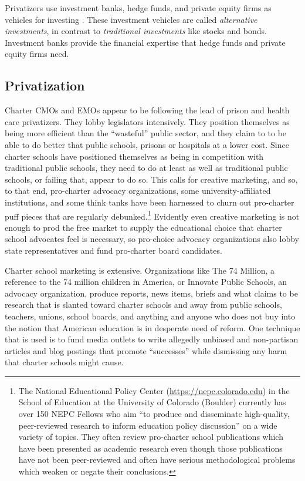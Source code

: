 Privatizers use investment banks, hedge funds, and private equity firms as vehicles for investing \parencite{Stowell2018}. These investment vehicles are called \textit{alternative investments}, in contrast to \textit{traditional investments} like stocks and bonds. Investment banks provide the financial expertise that hedge funds and private equity firms need. 

\subsection{Privatization}\label{sec:privatization}\indent

Charter CMOs and EMOs appear to be following the lead of prison and health care privatizers. They lobby legislators intensively. They position themselves as being more efficient than the ``wasteful'' public sector, and they claim to to be able to do better that public schools, prisons or hospitals at a lower cost. Since charter schools have positioned themselves as being in competition with traditional public schools, they need to do at least as well as traditional public schools, or failing that, appear to do so. This calls for creative marketing, and so, to that end, pro-charter advocacy organizations, some university-affiliated institutions, and some think tanks have been harnessed to churn out pro-charter puff pieces that are regularly debunked.\footnote{The National Educational Policy Center (\url{https://nepc.colorado.edu}) in the School of Education at the University of Colorado (Boulder) currently has over 150 NEPC Fellows who aim ``to produce and disseminate high-quality, peer-reviewed research to inform education policy discussion'' on a wide variety of topics. They often review pro-charter school publications which have been presented as academic research even though those publications have not been peer-reviewed and often have serious methodological problems which weaken or negate their conclusions.} Evidently even creative marketing is not enough to prod the free market to supply the educational choice that charter school advocates feel is necessary, so pro-choice advocacy organizations also lobby state representatives and fund pro-charter board candidates.

Charter school marketing is extensive. Organizations like The 74 Million, a reference to the 74 million children in America, or Innovate Public Schools, an advocacy organization, produce reports, news items, briefs and what claims to be research that is slanted toward charter schools and away from public schools, teachers, unions, school boards, and anything and anyone who does not buy into the notion that American education is in desperate need of reform. One technique that is used is to fund media outlets to write allegedly unbiased and non-partisan articles and blog postings that promote ``successes'' while dismissing any harm that charter schools might cause.

